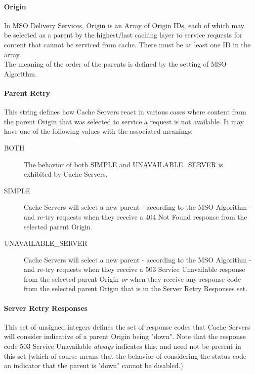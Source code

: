 \paragraph{Origin}
In MSO Delivery Services, Origin is an Array of Origin IDs, each of which may be
selected as a parent by the highest/last caching layer to service requests for
content that cannot be serviced from cache. There must be at least one ID in the
array.\\
The meaning of the order of the parents is defined by the setting of MSO
Algorithm.

\paragraph{Parent Retry}
This string defines how Cache Servers react in various cases where content from
the parent Origin that was selected to service a request is not available. It
may have one of the following values with the associated meanings:

\begin{description}
	\item[BOTH] The behavior of both SIMPLE and UNAVAILABLE\_SERVER
	is exhibited by Cache Servers.
	\item[SIMPLE] Cache Servers will select a new parent - according to the MSO
	Algorithm - and re-try requests when they receive a 404 Not Found response
	from the selected parent Origin.
	\item[UNAVAILABLE\_SERVER] Cache Servers will select a new parent -
	according to the MSO Algorithm - and re-try requests when they receive a
	503 Service Unavailable response from the selected parent Origin \emph{or}
	when they receive any response code from the selected parent Origin that is
	in the Server Retry Responses set.
\end{description}

\paragraph{Server Retry Responses}
This set of unsigned integers defines the set of response codes that Cache
Servers will consider indicative of a parent Origin being "down". Note that the
response code 503 Service Unavailable \emph{always} indicates this, and need not
be present in this set (which of course means that the behavior of considering
the status code an indicator that the parent is "down" cannot be disabled.)
